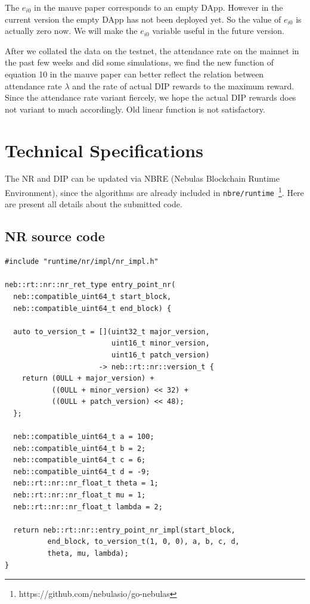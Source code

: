 \documentclass[11pt]{article}
\begin{document}
The $e_{i0}$ in the mauve paper corresponds to an empty DApp. However in the current version the empty DApp has not been deployed yet. So the value of $e_{i0}$ is actually zero now. We will make the $e_{i0}$ variable useful in the future version. 

After we collated the data on the testnet, the attendance rate on the mainnet in the past few weeks and did some simulations, we find the new function of equation 10 in the mauve paper can better reflect the relation between attendance rate $\lambda$ and the rate of actual DIP rewards to the maximum reward. Since the attendance rate variant fiercely, we hope the actual  DIP rewards does not variant to much accordingly. Old linear function is not satisfactory. 

\section{Technical Specifications}

The NR and DIP can be updated via NBRE (Nebulas Blockchain Runtime
Environment), since the algorithms are already included in
\texttt{nbre/runtime}~\footnote{https://github.com/nebulasio/go-nebulas}. Here
are present all details about the submitted code.

\subsection{NR source code}
\begin{lstlisting}
#include "runtime/nr/impl/nr_impl.h"

neb::rt::nr::nr_ret_type entry_point_nr(
  neb::compatible_uint64_t start_block,
  neb::compatible_uint64_t end_block) {

  auto to_version_t = [](uint32_t major_version,
                         uint16_t minor_version,
                         uint16_t patch_version)
                      -> neb::rt::nr::version_t {
    return (0ULL + major_version) +
           ((0ULL + minor_version) << 32) +
           ((0ULL + patch_version) << 48);
  };

  neb::compatible_uint64_t a = 100;
  neb::compatible_uint64_t b = 2;
  neb::compatible_uint64_t c = 6;
  neb::compatible_uint64_t d = -9;
  neb::rt::nr::nr_float_t theta = 1;
  neb::rt::nr::nr_float_t mu = 1;
  neb::rt::nr::nr_float_t lambda = 2;

  return neb::rt::nr::entry_point_nr_impl(start_block,
          end_block, to_version_t(1, 0, 0), a, b, c, d,
          theta, mu, lambda);
}
\end{lstlisting}
\end{document}
